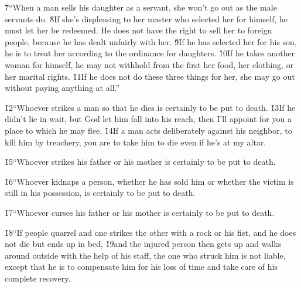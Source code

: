 \v{7}``When a man sells his daughter as a servant, she won't go out as the male servants do. \v{8}If she's displeasing to her master who selected her for himself, he must let her be redeemed. He does not have the right to sell her to foreign people, because he has dealt unfairly with her. \v{9}If he has selected her for his son, he is to treat her according to the ordinance for daughters. \v{10}If he takes another woman for himself, he may not withhold from the first her food, her clothing, or her marital rights. \v{11}If he does not do these three things for her, she may go out without paying anything at all.''

\v{12}``Whoever strikes a man so that he dies is certainly to be put to death. \v{13}If he didn't lie in wait, but God let him fall into his reach, then I'll appoint for you a place to which he may flee. \v{14}If a man acts deliberately against his neighbor, to kill him by treachery, you are to take him to die even if he's at my altar.

\v{15}``Whoever strikes his father or his mother is certainly to be put to death.

\v{16}``Whoever kidnaps a person, whether he has sold him or whether the victim is still in his possession, is certainly to be put to death.

\v{17}``Whoever curses his father or his mother is certainly to be put to death.

\v{18}``If people quarrel and one strikes the other with a rock or his fist, and he does not die but ends up in bed, \v{19}and the injured person then gets up and walks around outside with the help of his staff, the one who struck him is not liable, except that he is to compensate him for his loss of time and take care of his complete recovery.

